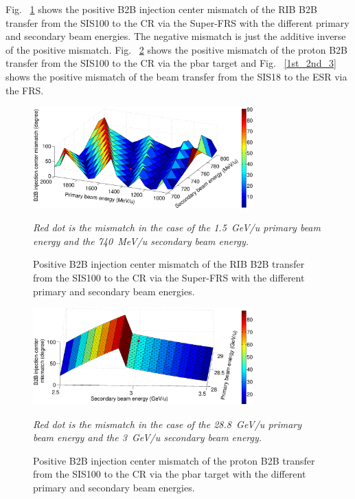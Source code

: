 Fig. ~\ref{1st_2nd_1} shows the positive B2B injection center mismatch of the RIB B2B transfer from the SIS100 to the CR via the Super-FRS with the different primary and secondary beam energies. The negative mismatch is just the additive inverse of the positive mismatch. Fig. ~\ref{1st_2nd_2} shows the positive mismatch of the proton B2B transfer from the SIS100 to the CR via the pbar target and Fig. ~\ref{1st_2nd_3} shows the positive mismatch of the beam transfer from the SIS18 to the ESR via the FRS. 

\begin{figure}[!htb]
   \centering   
   \includegraphics*[width=85mm]{RIB100CR.eps}
   \caption{Positive B2B injection center mismatch of the RIB B2B transfer from the SIS100 to the CR via the Super-FRS with the different primary and secondary beam energies.}{\textsl{\small{Red dot is the mismatch in the case of the \SI{1.5}{GeV/u} primary beam energy and the \SI{740}{MeV/u} secondary beam energy.}}}
   \label{1st_2nd_1}
\end{figure} 

\begin{figure}[!htb]
   \centering   
   \includegraphics*[width=85mm]{P100CR.eps}
   \caption{Positive B2B injection center mismatch of the proton B2B transfer from the SIS100 to the CR via the pbar target with the different primary and secondary beam energies.}{\textsl{\small{Red dot is the mismatch in the case of the \SI{28.8}{GeV/u} primary beam energy and the \SI{3}{GeV/u} secondary beam energy.}}}
   \label{1st_2nd_2}
\end{figure} 

